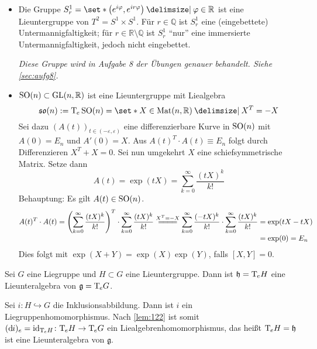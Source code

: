 \begin{beispiel*}[{name=[Lieuntergruppen]}]
	\leavevmode
	\begin{itemize}
		\item Die Gruppe $S^1_r = \set*{\enbrace*{e^{i \varphi}, e^{i r \varphi}} \given \varphi \in \mathbb{R}}$ ist eine Lieuntergruppe von $T^2=S^1 \times S^1$.
		Für $r \in \mathbb{Q}$ ist $S^1_r$ eine (eingebettete) Untermannigfaltigkeit; für $r \in \mathbb{R}\setminus \mathbb{Q}$ ist $S^1_r$ \enquote{nur} eine immersierte Untermannigfaltigkeit, jedoch nicht eingebettet.
		
		\emph{Diese Gruppe wird in Aufgabe 8 der Übungen genauer behandelt. Siehe \cref{sec:aufg8}.}
		\item $\operatorname{SO}(n) \subset \operatorname{GL}(n,\mathbb{R})$ ist eine Lieuntergruppe mit Liealgebra 
		\[
			\mathfrak{so}(n) := \Tmap_e \SO(n) = \set*{X \in \Mat(n,\mathbb{R}) \given X^T=-X}
		\]
		Sei dazu $(A(t))_{t \in (-\varepsilon,\varepsilon)}$ eine differenzierbare Kurve in $\operatorname{SO}(n)$ mit $A(0)=E_n$ und $A'(0)=X$.
		Aus $A(t)^T \cdot A(t) \equiv E_n$ folgt durch Differenzieren $X^T + X =0$.
		Sei nun umgekehrt $X$ eine schiefsymmetrische Matrix.
		Setze dann 
		\[
			A(t) =\exp(t X) = \sum_{k=0}^{\infty} \frac{(tX)^k}{k!} 
		\]
		Behauptung: Es gilt $A(t) \in \operatorname{SO}(n)$.
		\begin{align}
			A(t)^T \cdot A(t) = \enbrace*{\sum_{k=0}^{\infty} \frac{(tX)^k}{k!} }^T \cdot \sum_{k=0}^{\infty} \frac{(tX)^k}{k!} \stackrel{X^T=-X}{=\joinrel=\joinrel=\joinrel=}\sum_{k=0}^{\infty} \frac{(-tX)^k}{k!}  \cdot \sum_{k=0}^{\infty} \frac{(tX)^k}{k!} 
			&= \exp(tX-tX) \\[-3pt]
			&= \exp(0) =E_n
		\end{align}
		Dies folgt mit $\exp(X+Y)= \exp(X) \exp(Y)$, falls $[X,Y]=0$.
	\end{itemize}
\end{beispiel*}

\begin{lemma}[{name=[Lieunteralgebra zu einer Lieuntergruppe]}]
	Sei $G$ eine Liegruppe und $H \subset G$ eine Lieuntergruppe.
	Dann ist $\mathfrak{h} = \mathrm{T}\mkern-0.85mu_e H$ eine Lieunteralgebra von $\mathfrak{g} = \mathrm{T}\mkern-0.85mu_e G$.
\end{lemma}
\begin{beweis}
	Sei $i \colon H \hookrightarrow G$ die Inklusionsabbildung.
	Dann ist $i$ ein Liegruppenhomomorphismus.
	Nach \autoref{lem:122} ist somit $(\mathrm{d}\mkern-1.0mu i)_e = \operatorname{id}_{\mathrm{T}\mkern-0.85mu_e H} \colon \mathrm{T}\mkern-0.85mu_e H \to \mathrm{T}\mkern-0.85mu_e G$ ein Liealgebrenhomomorphismus, das heißt $\mathrm{T}\mkern-0.85mu_e H = \mathfrak{h}$ ist eine Lieunteralgebra von $\mathfrak{g}$.
\end{beweis}

